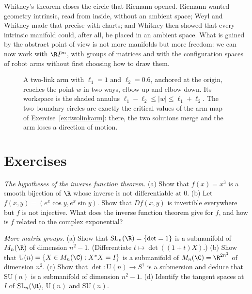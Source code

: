 Whitney's theorem closes the circle that Riemann opened. Riemann wanted geometry intrinsic, read from inside, without an ambient space; Weyl and Whitney
made that precise with charts; and Whitney then showed that every intrinsic manifold could, after all, be placed in an ambient space. What is gained by
the abstract point of view is not more manifolds but more freedom: we can now work with $\R P^n$, with groups of matrices and with the configuration
spaces of robot arms without first choosing how to draw them.

\begin{figure}[ht]
\centering
{}
\caption{A two-link arm with $\ell_1=1$ and $\ell_2=0.6$, anchored at the origin, reaches the point $w$ in two ways, elbow up and elbow down. Its
workspace is the shaded annulus $\ell_1-\ell_2\le|w|\le\ell_1+\ell_2$. The two boundary circles are exactly the critical values of the arm map of
Exercise~\ref{ex:twolinkarm}: there, the two solutions merge and the arm loses a direction of motion.}
\label{fig:arm}
\end{figure}

\section{Exercises}

\begin{exercise}[$\star$]\label{ex:cubeinverse}
\emph{The hypotheses of the inverse function theorem.} (a) Show that $f(x)=x^3$ is a smooth bijection of $\R$ whose inverse is not differentiable at $0$.
(b) Let $f(x,y)=(e^x\cos y,e^x\sin y)$. Show that $Df(x,y)$ is invertible everywhere but $f$ is not injective. What does the inverse function theorem
give for $f$, and how is $f$ related to the complex exponential?
\end{exercise}

\begin{exercise}[$\star$]\label{ex:matrixgroups}
\emph{More matrix groups.} (a) Show that $\mathrm{SL}_n(\R)=\{\det=1\}$ is a submanifold of $M_n(\R)$ of dimension $n^2-1$. (Differentiate
$t\mapsto\det((1+t)X)$.) (b) Show that $\mathrm U(n)=\{X\in M_n(\C):X^*X=I\}$ is a submanifold of $M_n(\C)=\R^{2n^2}$ of dimension $n^2$. (c) Show that
$\det\colon\mathrm U(n)\to S^1$ is a submersion and deduce that $\mathrm{SU}(n)$ is a submanifold of dimension $n^2-1$. (d) Identify the tangent spaces at
$I$ of $\mathrm{SL}_n(\R)$, $\mathrm U(n)$ and $\mathrm{SU}(n)$.
\end{exercise}

